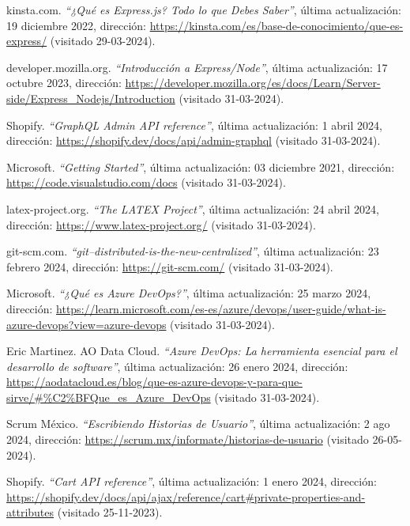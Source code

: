 \documentclass[12pt]{article}
\begin{document}
\begin{thebibliography}{100}
    kinsta.com.
    \textit{``¿Qué es Express.js? Todo lo que Debes Saber''}, última actualización: 19 diciembre 2022, dirección: \url{https://kinsta.com/es/base-de-conocimiento/que-es-express/} (visitado 29-03-2024).
    
    developer.mozilla.org.
    \textit{``Introducción a Express/Node''}, última actualización: 17 octubre 2023, dirección: \url{https://developer.mozilla.org/es/docs/Learn/Server-side/Express_Nodejs/Introduction} (visitado 31-03-2024).

    Shopify.
    \textit{``GraphQL Admin API reference''}, última actualización: 1 abril 2024, dirección: \url{https://shopify.dev/docs/api/admin-graphql} (visitado 31-03-2024).

    Microsoft.
    \textit{``Getting Started''}, última actualización: 03 diciembre 2021, dirección: \url{https://code.visualstudio.com/docs} (visitado 31-03-2024).

    latex-project.org.
    \textit{``The LATEX Project''}, última actualización: 24 abril 2024, dirección: \url{https://www.latex-project.org/} (visitado 31-03-2024).

    git-scm.com.
    \textit{``git--distributed-is-the-new-centralized''}, última actualización: 23 febrero 2024, dirección: \url{https://git-scm.com/} (visitado 31-03-2024).

    Microsoft.
    \textit{``¿Qué es Azure DevOps?''}, última actualización: 25 marzo 2024, dirección: \url{https://learn.microsoft.com/es-es/azure/devops/user-guide/what-is-azure-devops?view=azure-devops} (visitado 31-03-2024).

    Eric Martinez. AO Data Cloud.
    \textit{``Azure DevOps: La herramienta esencial para el desarrollo de software''}, última actualización: 26 enero 2024, dirección: \url{https://aodatacloud.es/blog/que-es-azure-devops-y-para-que-sirve/#%C2%BFQue_es_Azure_DevOps} (visitado 31-03-2024).

    Scrum México.
    \textit{``Escribiendo Historias de Usuario''}, última actualización: 2 ago 2024, dirección: \url{https://scrum.mx/informate/historias-de-usuario} (visitado 26-05-2024).
    
    Shopify.
    \textit{``Cart API reference''}, última actualización: 1 enero 2024, dirección: \url{https://shopify.dev/docs/api/ajax/reference/cart#private-properties-and-attributes} (visitado 25-11-2023).


\end{thebibliography}
\end{document}
